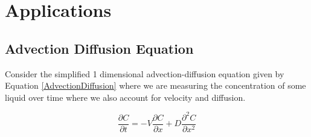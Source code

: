 \documentclass{article}
\begin{document}
\section{Applications}

\subsection{Advection Diffusion Equation}

Consider the simplified 1 dimensional advection-diffusion equation given by Equation \ref{AdvectionDiffusion} where we are measuring the concentration of some liquid over time where we also account for velocity and diffusion.

\begin{equation}
    \label{AdvectionDiffusion}
    \frac{\partial C}{\partial t} = - V\frac{\partial C}{\partial x} + D\frac{\partial^2 C}{\partial x^2}
\end{equation}




\end{document}

